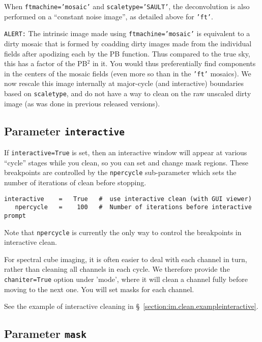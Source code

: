 When {\tt ftmachine='mosaic'} and {\tt scaletype='SAULT'}, the
deconvolution is also performed on a ``constant noise image'',
as detailed above for {\tt 'ft'}. 

{\tt ALERT:} The intrinsic image made using {\tt ftmachine='mosaic'} is equivalent
to a dirty mosaic that is formed by coadding dirty images made from
the individual fields after apodizing each by the PB function.  Thus
compared to the true sky, this has a factor of the PB$^2$ in it.  You
would thus preferentially find components in the centers of the mosaic
fields (even more so than in the {\tt 'ft'} mosaics).  We now rescale
this image internally at major-cycle (and interactive) boundaries
based on {\tt scaletype}, and do not have a way to clean on the raw
unscaled dirty image (as was done in previous released versions).

\subsection{Parameter {\tt interactive} }
\label{section:im.clean.interactive}

If {\tt interactive=True} is set, then an interactive window
will appear at various ``cycle'' stages while you clean, so you
can set and change mask regions.  These breakpoints are controlled
by the {\tt npercycle} sub-parameter which sets the number of
iterations of clean before stopping.
\small
\begin{verbatim}
interactive    =   True   #  use interactive clean (with GUI viewer)
   npercycle   =    100   #  Number of iterations before interactive prompt
\end{verbatim}
\normalsize
Note that {\tt npercycle} is currently the only way to control the
breakpoints in interactive clean. 

For spectral cube imaging, it is often easier to deal with each
channel in turn, rather than cleaning all channels in each cycle.  We
therefore provide the {\tt chaniter=True} option under 'mode', where
it will clean a channel fully before moving to the next one.  You will
set masks for each channel. 

See the example of interactive cleaning in 
\S~\ref{section:im.clean.exampleinteractive}.

\subsection{Parameter {\tt mask} }
\label{section:im.clean.mask}

